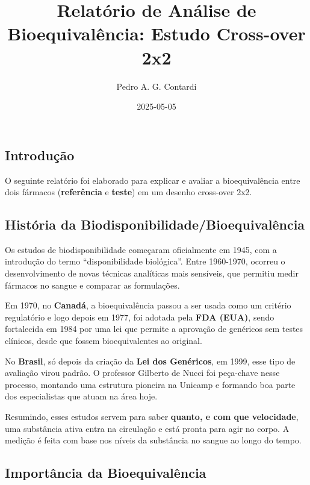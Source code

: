 \documentclass[
]{article}
\title{Relatório de Análise de Bioequivalência: Estudo Cross-over 2x2}
\author{Pedro A. G. Contardi}
\date{2025-05-05}
\begin{document}
\maketitle

\hypertarget{introduuxe7uxe3o}{%
\subsection{Introdução}\label{introduuxe7uxe3o}}

O seguinte relatório foi elaborado para explicar e avaliar a
bioequivalência entre dois fármacos (\textbf{referência} e
\textbf{teste}) em um desenho cross-over 2x2.

\hypertarget{histuxf3ria-da-biodisponibilidadebioequivaluxeancia}{%
\subsection{História da
Biodisponibilidade/Bioequivalência}\label{histuxf3ria-da-biodisponibilidadebioequivaluxeancia}}

Os estudos de biodisponibilidade começaram oficialmente em 1945, com a
introdução do termo ``disponibilidade biológica''. Entre 1960-1970,
ocorreu o desenvolvimento de novas técnicas analíticas mais sensíveis,
que permitiu medir fármacos no sangue e comparar as formulações.

Em 1970, no \textbf{Canadá}, a bioequivalência passou a ser usada como
um critério regulatório e logo depois em 1977, foi adotada pela
\textbf{FDA (EUA)}, sendo fortalecida em 1984 por uma lei que permite a
aprovação de genéricos sem testes clínicos, desde que fossem
bioequivalentes ao original.

No \textbf{Brasil}, só depois da criação da \textbf{Lei dos Genéricos},
em 1999, esse tipo de avaliação virou padrão. O professor Gilberto de
Nucci foi peça-chave nesse processo, montando uma estrutura pioneira na
Unicamp e formando boa parte dos especialistas que atuam na área hoje.

Resumindo, esses estudos servem para saber \textbf{quanto, e com que
velocidade}, uma substância ativa entra na circulação e está pronta para
agir no corpo. A medição é feita com base nos níveis da substância no
sangue ao longo do tempo.

\hypertarget{importuxe2ncia-da-bioequivaluxeancia}{%
\subsection{Importância da
Bioequivalência}\label{importuxe2ncia-da-bioequivaluxeancia}}
\end{document}
